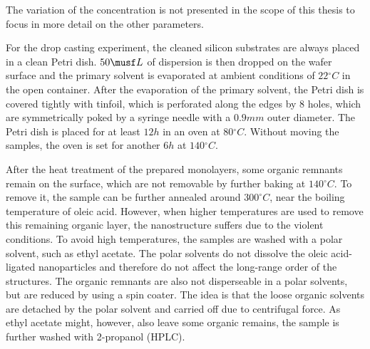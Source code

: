 \documentclass[\main/dresen_thesis.tex]{subfiles}
\begin{document}
    The variation of the concentration is not presented in the scope of this thesis to focus in more detail on the other parameters.

      For the drop casting experiment, the cleaned silicon substrates are always placed in a clean Petri dish.
      $50 \musf L$ of dispersion is then dropped on the wafer surface and the primary solvent is evaporated at ambient conditions of $22 \unit{^\circ C}$ in the open container.
      After the evaporation of the primary solvent, the Petri dish is covered tightly with tinfoil, which is perforated along the edges by 8 holes, which are symmetrically poked by a syringe needle with a $0.9 \unit{mm}$ outer diameter.
      The Petri dish is placed for at least $12 \unit{h}$ in an oven at $80 \unit{^\circ C}$.
      Without moving the samples, the oven is set for another $6 \unit{h}$ at $140\unit{^\circ C}$.

      After the heat treatment of the prepared monolayers, some organic remnants remain on the surface, which are not removable by further baking at $140 \unit{^\circ C}$. 
      To remove it, the sample can be further annealed around $300 ^\circ C$, near the boiling temperature of oleic acid.
      However, when higher temperatures are used to remove this remaining organic layer, the nanostructure suffers due to the violent conditions.
      To avoid high temperatures, the samples are washed with a polar solvent, such as ethyl acetate.
      The polar solvents do not dissolve the oleic acid-ligated nanoparticles and therefore do not affect the long-range order of the structures.
      The organic remnants are also not disperseable in a polar solvents, but are reduced by using a spin coater.
      The idea is that the loose organic solvents are detached by the polar solvent and carried off due to centrifugal force.
      As ethyl acetate might, however, also leave some organic remains, the sample is further washed with 2-propanol (HPLC).
\end{document}
